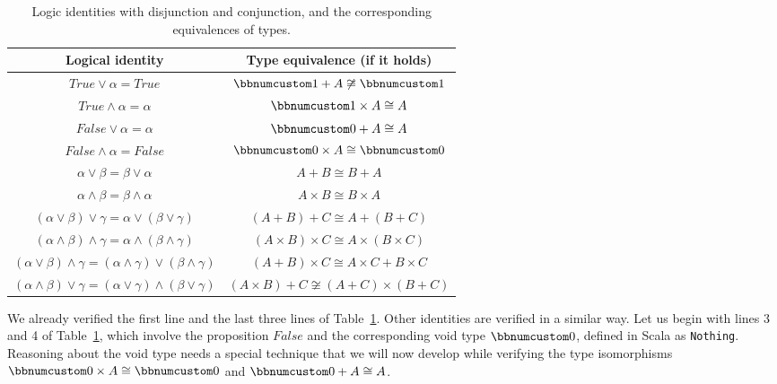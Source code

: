 \begin{table}
\begin{centering}
\begin{tabular}{|c|c|}
\hline 
\textbf{\small{}Logical identity} & \textbf{\small{}Type equivalence (if it holds)}\tabularnewline
\hline 
\hline 
{\small{}$True\vee\alpha=True$} & {\small{}$\bbnum 1+A\not\cong\bbnum 1$}\tabularnewline
\hline 
{\small{}$True\wedge\alpha=\alpha$} & {\small{}$\bbnum 1\times A\cong A$}\tabularnewline
\hline 
{\small{}$False\vee\alpha=\alpha$} & {\small{}$\bbnum 0+A\cong A$}\tabularnewline
\hline 
{\small{}$False\wedge\alpha=False$} & {\small{}$\bbnum 0\times A\cong\bbnum 0$}\tabularnewline
\hline 
{\small{}$\alpha\vee\beta=\beta\vee\alpha$} & {\small{}$A+B\cong B+A$}\tabularnewline
\hline 
{\small{}$\alpha\wedge\beta=\beta\wedge\alpha$} & {\small{}$A\times B\cong B\times A$}\tabularnewline
\hline 
{\small{}$\left(\alpha\vee\beta\right)\vee\gamma=\alpha\vee\left(\beta\vee\gamma\right)$} & {\small{}$\left(A+B\right)+C\cong A+\left(B+C\right)$}\tabularnewline
\hline 
{\small{}$\left(\alpha\wedge\beta\right)\wedge\gamma=\alpha\wedge\left(\beta\wedge\gamma\right)$} & {\small{}$\left(A\times B\right)\times C\cong A\times\left(B\times C\right)$}\tabularnewline
\hline 
{\small{}$\left(\alpha\vee\beta\right)\wedge\gamma=\left(\alpha\wedge\gamma\right)\vee\left(\beta\wedge\gamma\right)$} & {\small{}$\left(A+B\right)\times C\cong A\times C+B\times C$}\tabularnewline
\hline 
{\small{}$\left(\alpha\wedge\beta\right)\vee\gamma=\left(\alpha\vee\gamma\right)\wedge\left(\beta\vee\gamma\right)$} & {\small{}$\left(A\times B\right)+C\not\cong\left(A+C\right)\times\left(B+C\right)$}\tabularnewline
\hline 
\end{tabular}
\par\end{centering}
\caption{Logic identities with disjunction and conjunction, and the corresponding
equivalences of types.\label{tab:Logical-identities-with-disjunction-and-conjunction}}
\end{table}

We already verified the first line and the last three lines of Table~\ref{tab:Logical-identities-with-disjunction-and-conjunction}.
Other identities are verified in a similar way. Let us begin with
lines 3 and 4 of Table~\ref{tab:Logical-identities-with-disjunction-and-conjunction},
which involve the proposition $False$ and the corresponding void
type $\bbnum 0$, defined in Scala as \lstinline!Nothing!. Reasoning
about the void type needs a special technique that we will now develop
while verifying the type isomorphisms $\bbnum 0\times A\cong\bbnum 0$
and $\bbnum 0+A\cong A$.

